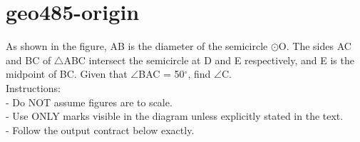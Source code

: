 \documentclass[12pt]{article}
\begin{document}
\section*{geo485-origin}
\noindent\begin{minipage}{\textwidth}
\setlength{\parskip}{4pt}
As shown in the figure, AB is the diameter of the semicircle \ensuremath{\odot }O. The sides AC and BC of \ensuremath{\triangle }ABC intersect the semicircle at D and E respectively, and E is the midpoint of BC. Given that \ensuremath{\angle }BAC = 50\ensuremath{^\circ}, find \ensuremath{\angle }C.\\
Instructions:\\
- Do NOT assume figures are to scale.\\
- Use ONLY marks visible in the diagram unless explicitly stated in the text.\\
- Follow the output contract below exactly.\\
\end{minipage}
\end{document}

